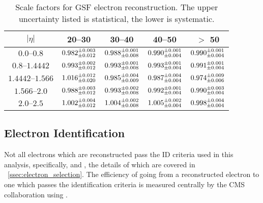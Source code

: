 \begin{table}[h]
\centering
\begin{center}
    \begin{tabular}{ | c | c | c | c | c |} \hline
	$|\eta|$                   & 20--30 \GeV                        & 30--40 \GeV                        & 40--50 \GeV                        & $>$ 50 \GeV                        \\ \hline
	$\numrange{0.0}{0.8}$      & $0.982^{\pm 0.003}_{\pm 0.012}$ & $0.988^{\pm 0.001}_{\pm 0.008}$ & $0.990^{\pm 0.001}_{\pm 0.004}$ & $0.990^{\pm 0.001}_{\pm 0.004}$ \\ \hline
	$\numrange{0.8}{1.4442}$   & $0.993^{\pm 0.002}_{\pm 0.012}$ & $0.993^{\pm 0.001}_{\pm 0.008}$ & $0.993^{\pm 0.001}_{\pm 0.004}$ & $0.991^{\pm 0.001}_{\pm 0.004}$ \\ \hline
	$\numrange{1.4442}{1.566}$ & $1.016^{\pm 0.012}_{\pm 0.020}$ & $0.985^{\pm 0.004}_{\pm 0.009}$ & $0.987^{\pm 0.004}_{\pm 0.004}$ & $0.974^{\pm 0.009}_{\pm 0.006}$ \\ \hline
	$\numrange{1.566}{2.0}$    & $0.988^{\pm 0.003}_{\pm 0.012}$ & $0.993^{\pm 0.002}_{\pm 0.008}$ & $0.992^{\pm 0.001}_{\pm 0.004}$ & $0.990^{\pm 0.003}_{\pm 0.004}$ \\ \hline
	$\numrange{2.0}{2.5}$      & $1.002^{\pm 0.004}_{\pm 0.012}$ & $1.004^{\pm 0.002}_{\pm 0.008}$ & $1.005^{\pm 0.002}_{\pm 0.004}$ & $0.998^{\pm 0.004}_{\pm 0.004}$ \\ \hline
    \end{tabular}
\end{center}
\caption{
    Scale factors for GSF electron reconstruction. The upper uncertainty listed
    is statistical, the lower is systematic.
}
\label{table:gsf_scale_factor}
\end{table}

\subsection{Electron Identification}
\label{ssec:sf_id}

Not all electrons which are reconstructed pass the ID criteria used in this
analysis, specifically, \EGMEDIUM and \EGTIGHT, the details of which are
covered in \SEC~\ref{ssec:electron_selection}. The efficiency of going from a
reconstructed electron to one which passes the identification criteria is
measured centrally by the CMS collaboration using \TnP \cite{cms_an_2014-055}.

